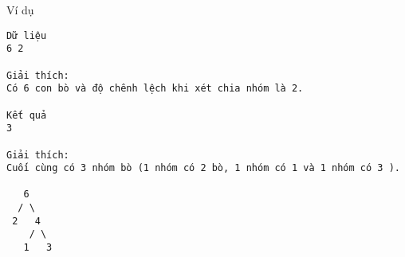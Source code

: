 Ví dụ
\begin{verbatim}
Dữ liệu
6 2

Giải thích:
Có 6 con bò và độ chênh lệch khi xét chia nhóm là 2.

Kết quả
3

Giải thích:
Cuối cùng có 3 nhóm bò (1 nhóm có 2 bò, 1 nhóm có 1 và 1 nhóm có 3 ).

   6
  / \
 2   4
    / \
   1   3
\end{verbatim}